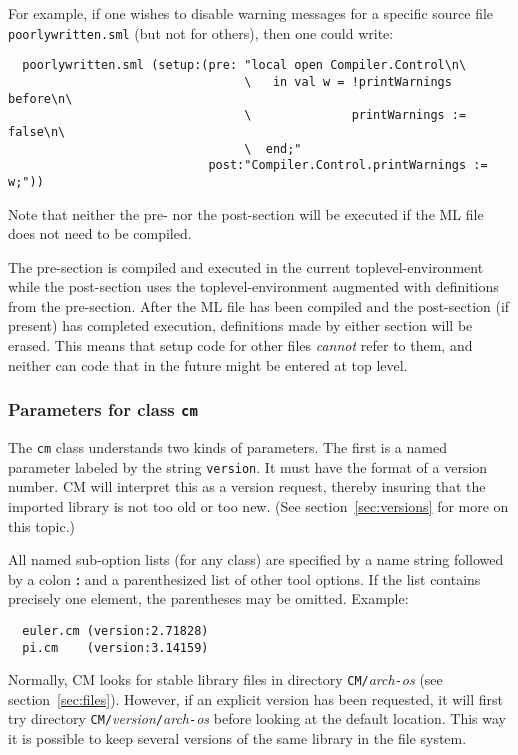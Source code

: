 \documentclass[titlepage,letterpaper]{article}
\begin{document}
For example, if one wishes to disable warning messages for a specific
source file {\tt poorlywritten.sml} (but not for others), then one
could write:

\begin{verbatim}
  poorlywritten.sml (setup:(pre: "local open Compiler.Control\n\
                                 \   in val w = !printWarnings before\n\
                                 \              printWarnings := false\n\
                                 \  end;"
                            post:"Compiler.Control.printWarnings := w;"))
\end{verbatim}

\noindent Note that neither the pre- nor the post-section will be
executed if the ML file does not need to be compiled.

The pre-section is compiled and executed in the current
toplevel-environment while the post-section uses the
toplevel-environment augmented with definitions from the pre-section.
After the ML file has been compiled and the post-section (if present)
has completed execution, definitions made by either section will be
erased.  This means that setup code for other files {\em cannot} refer
to them, and neither can code that in the future might be entered at
top level.

\subsubsection{Parameters for class {\tt cm}}
\label{sec:toolparam:cm}

The {\tt cm} class understands two kinds of parameters.  The first is
a named parameter labeled by the string {\tt version}.  It must have
the format of a version number.  CM will interpret this as a version
request, thereby insuring that the imported library is not too old or
too new. (See section~\ref{sec:versions} for more on this topic.)

All named sub-option lists (for any class) are specified by a name
string followed by a colon {\bf :} and a parenthesized list of other
tool options.  If the list contains precisely one element, the
parentheses may be omitted.  Example:

\begin{verbatim}
  euler.cm (version:2.71828)
  pi.cm    (version:3.14159)
\end{verbatim}

Normally, CM looks for stable library files in directory
{\tt CM/}{\it arch}{\tt -}{\it os} (see section~\ref{sec:files}).
However, if an explicit version has been requested, it will first try
directory {\tt CM/}{\it version}{\tt /}{\it arch}{\tt -}{\it os}
before looking at the default location.  This way it is possible to
keep several versions of the same library in the file system.
\end{document}
